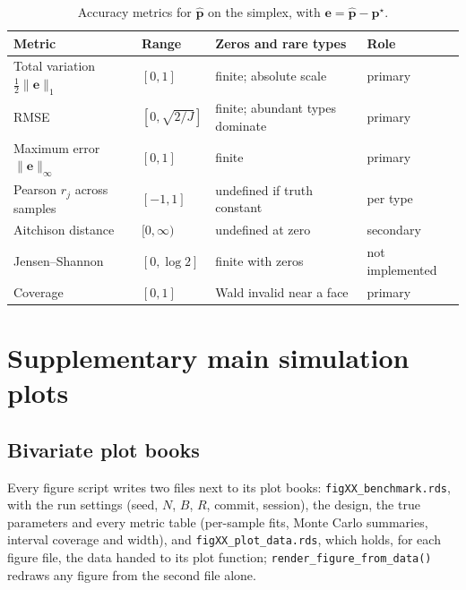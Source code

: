 \begin{table}[ht]
  \centering
  \small
  \caption{Accuracy metrics for \(\hat{\boldsymbol{p}}\) on the simplex, with \(\boldsymbol{e}=\hat{\boldsymbol{p}}-\boldsymbol{p}^{\star}\).}
  \label{tab:perf-metrics}
  \begin{tabular}{@{}>{\raggedright\arraybackslash}p{}l>{\raggedright\arraybackslash}p{}l@{}}
    \toprule
    Metric & Range & Zeros and rare types & Role \\
    \midrule
    Total variation \(\tfrac12\lVert\boldsymbol{e}\rVert_{1}\) & \([0,1]\) & finite; absolute scale & primary \\
    RMSE & \([0,\sqrt{2/J}]\) & finite; abundant types dominate & primary \\
    Maximum error \(\lVert\boldsymbol{e}\rVert_{\infty}\) & \([0,1]\) & finite & primary \\
    Pearson \(r_{j}\) across samples & \([-1,1]\) & undefined if truth constant & per type \\
    Aitchison distance & \([0,\infty)\) & undefined at zero & secondary \\
    Jensen--Shannon & \([0,\log 2]\) & finite with zeros & not implemented \\
    Coverage & \([0,1]\) & Wald invalid near a face & primary \\
    \bottomrule
  \end{tabular}
\end{table}

\section{Supplementary main simulation plots}
\label{app:books}

\subsection{Bivariate plot books}
\label{app:fig02}

Every figure script writes two files next to its plot books: \texttt{figXX\_benchmark.rds}, with the run settings
(seed, \(N\), \(B\), \(R\), commit, session), the design, the true parameters and every metric table (per-sample fits,
Monte Carlo summaries, interval coverage and width), and \texttt{figXX\_plot\_data.rds}, which holds, for each figure
file, the data handed to its plot function; \texttt{render\_figure\_from\_data()} redraws any figure from the second file
alone.

